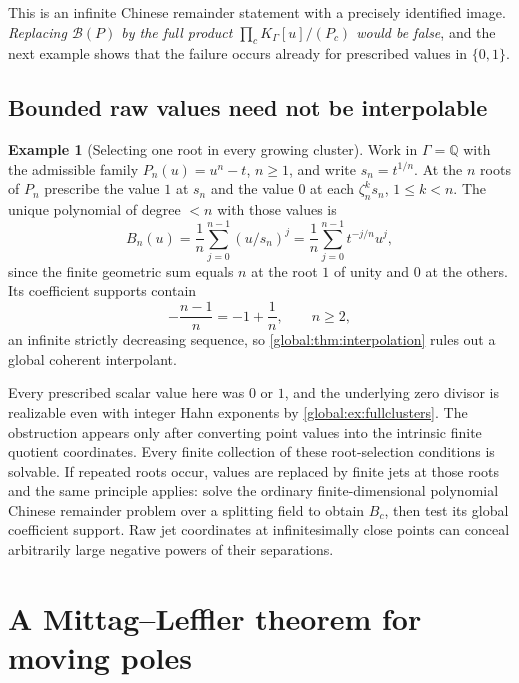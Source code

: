 \documentclass[11pt,letterpaper]{article}
\theoremstyle{definition}
\newtheorem{example}[example]{Example}
\theoremstyle{remark}
\newcommand{\Q}{\mathbb Q}
\newcommand{\KK}{K_\Gamma}
\newcommand{\BB}{\mathscr B(P)}
\numberwithin{equation}{section}
\begin{document}
This is an infinite Chinese remainder statement with a precisely identified image. \emph{Replacing $\BB$ by the full product $\prod_c\KK[u]/(P_c)$ would be false}, and the next example shows that the failure occurs already for prescribed values in $\{0,1\}$.

\subsection{Bounded raw values need not be interpolable}

\begin{example}[Selecting one root in every growing cluster]\label{global:ex:selector}
Work in $\Gamma=\Q$ with the admissible family $P_n(u)=u^n-t$, $n\ge1$, and write $s_n=t^{1/n}$. At the $n$ roots of $P_n$ prescribe the value $1$ at $s_n$ and the value $0$ at each $\zeta_n^ks_n$, $1\le k<n$. The unique polynomial of degree $<n$ with those values is
\begin{equation}\label{global:eq:selector}
  B_n(u)=\frac1n\sum_{j=0}^{n-1}(u/s_n)^j
  =\frac1n\sum_{j=0}^{n-1}t^{-j/n}u^j,
\end{equation}
since the finite geometric sum equals $n$ at the root $1$ of unity and $0$ at the others. Its coefficient supports contain
\[
  -\frac{n-1}{n}=-1+\frac1n,\qquad n\ge2,
\]
an infinite strictly decreasing sequence, so \cref{global:thm:interpolation} rules out a global coherent interpolant.
\end{example}

Every prescribed scalar value here was $0$ or $1$, and the underlying zero divisor is realizable even with integer Hahn exponents by \cref{global:ex:fullclusters}. The obstruction appears only after converting point values into the intrinsic finite quotient coordinates. Every finite collection of these root-selection conditions is solvable. If repeated roots occur, values are replaced by finite jets at those roots and the same principle applies: solve the ordinary finite-dimensional polynomial Chinese remainder problem over a splitting field to obtain $B_c$, then test its global coefficient support. Raw jet coordinates at infinitesimally close points can conceal arbitrarily large negative powers of their separations.

\section{A Mittag--Leffler theorem for moving poles}\label{global:sec:movingML}
\end{document}
